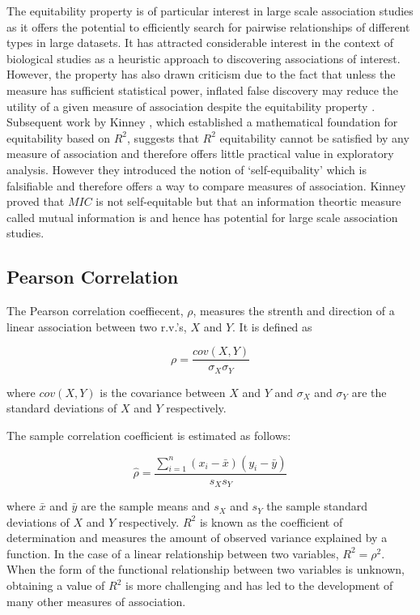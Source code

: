 \documentclass[a4paper, 12pt]{report}
\begin{document}
The equitability property is of particular interest in large scale association studies as it offers the potential to efficiently search for pairwise relationships of different types in large datasets. It has attracted considerable interest in the context of biological studies \cite{bigdata2012} as a heuristic approach to discovering associations of interest. However, the property has also drawn criticism due to the fact that unless the measure has sufficient statistical power, inflated false discovery may reduce the utility of a given measure of association despite the equitability property \cite{Tibshirani2011}. Subsequent work by Kinney \cite{Kinney19082014}, which established a mathematical foundation for equitability based on $R^2$, suggests that $R^2$ equitability cannot be satisfied by any measure of association and therefore offers little practical value in exploratory analysis. However they introduced the notion of `self-equibality' which is falsifiable and therefore offers a way to compare measures of association. Kinney \cite{Kinney19082014} proved that $MIC$ is not self-equitable but that an information theortic measure called mutual information is and hence has potential for large scale association studies.


\subsection*{Pearson Correlation}
The Pearson correlation coeffiecent, $\rho$, measures the strenth and direction of a linear association between two r.v.'s, $X$ and $Y$. It is defined as

\[
\rho = \frac{cov(X,Y)}{\sigma_X \sigma_Y}
\]

where $cov(X,Y)$ is the covariance between $X$ and $Y$ and $\sigma_X$ and $\sigma_Y$ are the standard deviations of $X$ and $Y$ respectively.

The sample correlation coefficient is estimated as follows:

\[
\hat{\rho} = \frac{\sum_{i=1}^n(x_i - \bar{x})(y_i - \bar{y})}{s_X s_Y}
\]

where $\bar{x}$ and $\bar{y}$ are the sample means and $s_X$ and $s_Y$ the sample standard deviations of $X$ and $Y$ respectively. $R^2$  is known as the coefficient of determination and measures the amount of observed variance explained by a function. In the case of a linear relationship between two variables, $R^2 = \rho^2$. When the form of the functional relationship between two variables is unknown, obtaining a value of $R^2$ is more challenging \cite{Murrel:2013:Online} and has led to the development of many other measures of association.
\end{document}
